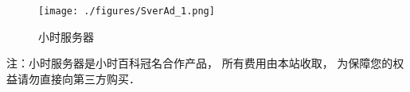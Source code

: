 
\begin{figure}[ht]
\centering
\texttt{[image: ./figures/SverAd\_1.png]}
\caption{小时服务器} \label{SverAd_fig1}
\end{figure}

注：小时服务器是小时百科冠名合作产品， 所有费用由本站收取， 为保障您的权益请勿直接向第三方购买．
